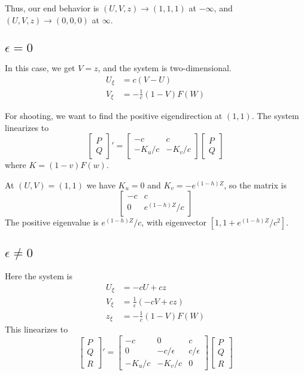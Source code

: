 \documentclass[10pt]{article}
\begin{document}
Thus, our end behavior is $(U,V,z) \to (1,1,1)$ at $-\infty$, and $(U,V,z) \to (0,0,0)$ at $\infty$.

\subsection{$\epsilon = 0$}
In this case, we get $V = z$, and the system is two-dimensional.
\begin{align}
U_\xi &= c(V-U) \label{front_eps0} \\
V_\xi &= - \frac{1}{c}(1-V)F(W)
\end{align}

For shooting, we want to find the positive eigendirection at $(1,1)$.
The system linearizes to
\[
\begin{bmatrix}
P\\Q
\end{bmatrix}'
=
\begin{bmatrix}
-c & c \\
-K_u/c & -K_v/c
\end{bmatrix}
\begin{bmatrix}
P\\Q
\end{bmatrix}
\]
where $K = (1-v)F(w)$.

At $(U,V) = (1,1)$ we have $K_u = 0$ and $K_v = - e^{(1-h)Z}$, so the matrix is
\[
\begin{bmatrix}
-c & c \\
0 & e^{(1-h)Z}/c
\end{bmatrix}
\]
The positive eigenvalue is $e^{(1-h)Z}/c$, with eigenvector $[1,1+e^{(1-h)Z}/c^2]$.

\subsection{$\epsilon \neq 0$}
Here the system is
\begin{align}
U_\xi &= -cU + cz \\
V_\xi &= \frac{1}{\epsilon}(-cV + cz) \\
z_\xi &= -\frac{1}{c}(1-V)F(W)
\end{align}
This linearizes to
\[
\begin{bmatrix}
P\\Q\\R
\end{bmatrix}'
=
\begin{bmatrix}
-c & 0 & c \\
0 & -c/\epsilon & c/\epsilon \\
-K_u/c & -K_v/c & 0
\end{bmatrix}
\begin{bmatrix}
P\\Q\\R
\end{bmatrix}
\]
\end{document}
